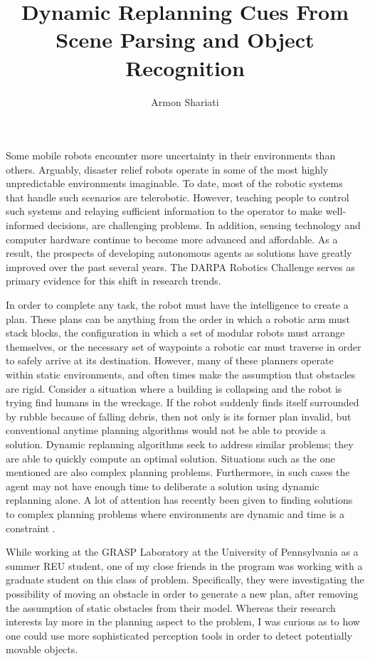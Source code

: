 \documentclass[10pt]{article}
\begin{document}
\author{Armon Shariati}
\title{Dynamic Replanning Cues From Scene Parsing and Object Recognition}
\date{}
\maketitle

Some mobile robots encounter more uncertainty in their environments than
others.  Arguably, disaster relief robots operate in some of the most highly
unpredictable environments imaginable. To date, most of the robotic systems
that handle such scenarios are telerobotic. However, teaching people to control
such systems and relaying sufficient information to the operator to make
well-informed decisions, are challenging problems. In addition, sensing
technology and computer hardware continue to become more advanced and
affordable. As a result, the prospects of developing autonomous agents as
solutions have greatly improved over the past several years. The DARPA Robotics
Challenge serves as primary evidence for this shift in research trends.

In order to complete any task, the robot must have the intelligence to create a
plan. These plans can be anything from the order in which a robotic arm must
stack blocks, the configuration in which a set of modular robots must arrange
themselves, or the necessary set of waypoints a robotic car must traverse in
order to safely arrive at its destination. However, many of these planners
operate within static environments, and often times make the assumption that
obstacles are rigid. Consider a situation where a building is collapsing and
the robot is trying find humans in the wreckage. If the robot suddenly finds
itself surrounded by rubble because of falling debris, then not only is its
former plan invalid, but conventional anytime planning algorithms would not be
able to provide a solution. Dynamic replanning algorithms seek to address
similar problems; they are able to quickly compute an optimal solution.
Situations such as the one mentioned are also complex planning problems.
Furthermore, in such cases the agent may not have enough time to deliberate a
solution using dynamic replanning alone. A lot of attention has recently been
given to finding solutions to complex planning problems where environments are
dynamic and time is a constraint \cite{likhachev}.

While working at the GRASP Laboratory at the University of Pennsylvania as a
summer REU student, one of my close friends in the program was working with a
graduate student on this class of problem. Specifically, they were
investigating the possibility of moving an obstacle in order to generate a new
plan, after removing the assumption of static obstacles from their model. Whereas
their research interests lay more in the planning aspect to the problem, I
was curious as to how one could use more sophisticated perception tools 
in order to detect potentially movable objects.
\end{document}

